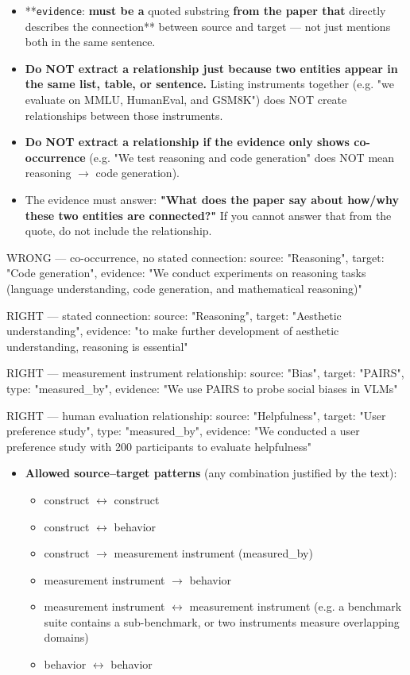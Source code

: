\begin{tcolorbox}[breakable,enhanced,colback=blue!3,colframe=blue!40!black,title={Prompt},fonttitle=\bfseries,left=8pt,right=8pt,top=6pt,bottom=6pt]
\begin{itemize}
\item **\texttt{evidence}:\textbf{ must be a }quoted substring\textbf{ from the paper that }directly describes the connection** between source and target --- not just mentions both in the same sentence.
\item \textbf{Do NOT extract a relationship just because two entities appear in the same list, table, or sentence.} Listing instruments together (e.g. "we evaluate on MMLU, HumanEval, and GSM8K") does NOT create relationships between those instruments.
\item \textbf{Do NOT extract a relationship if the evidence only shows co-occurrence} (e.g. "We test reasoning and code generation" does NOT mean reasoning $\rightarrow$ code generation).
\item The evidence must answer: \textbf{"What does the paper say about how/why these two entities are connected?"} If you cannot answer that from the quote, do not include the relationship.
\end{itemize}

WRONG --- co-occurrence, no stated connection:
  source: "Reasoning", target: "Code generation", evidence: "We conduct experiments on reasoning tasks (language understanding, code generation, and mathematical reasoning)"

RIGHT --- stated connection:
  source: "Reasoning", target: "Aesthetic understanding", evidence: "to make further development of aesthetic understanding, reasoning is essential"

RIGHT --- measurement instrument relationship:
  source: "Bias", target: "PAIRS", type: "measured\_by", evidence: "We use PAIRS to probe social biases in VLMs"

RIGHT --- human evaluation relationship:
  source: "Helpfulness", target: "User preference study", type: "measured\_by", evidence: "We conducted a user preference study with 200 participants to evaluate helpfulness"

\begin{itemize}
\item \textbf{Allowed source--target patterns} (any combination justified by the text):
\begin{itemize}
\item construct $\leftrightarrow$ construct
\item construct $\leftrightarrow$ behavior
\item construct $\rightarrow$ measurement instrument (measured\_by)
\item measurement instrument $\rightarrow$ behavior
\item measurement instrument $\leftrightarrow$ measurement instrument (e.g. a benchmark suite contains a sub-benchmark, or two instruments measure overlapping domains)
\item behavior $\leftrightarrow$ behavior
\end{itemize}
\end{itemize}


\end{tcolorbox}
